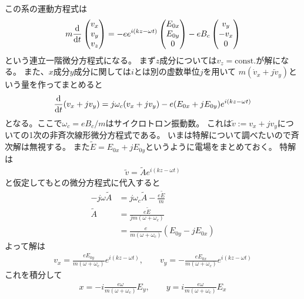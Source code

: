 \documentclass[../../master.tex]{subfiles}
\begin{document}
\section{}
この系の運動方程式は
\begin{align}
    m\dv{t}\begin{pmatrix}
        v_x\\ v_y\\ v_z
    \end{pmatrix}
    =-ee^{i(kz-\omega t)}\begin{pmatrix}
        E_{0x}\\E_{0y}\\0
    \end{pmatrix}
    -eB_c\begin{pmatrix}
        v_y\\ -v_x\\0
    \end{pmatrix}
\end{align}
という連立一階微分方程式になる。
まず\(z\)成分については\(v_z=\text{const.}\)が解になる。
また、\(x\)成分\(y\)成分に関しては\(i\)とは別の虚数単位\(j\)を用いて
\(m(\dot{v}_x+j\dot{v}_y)\)という量を作ってまとめると
\begin{align}
    \dv{t}(v_x+jv_y) = j\omega_c (v_x+jv_y) -e(E_{0x}+jE_{0y})e^{i(kz-\omega t)}
\end{align}
となる。ここで\(\omega_c=eB_c/m\)はサイクロトロン振動数。
これは\(\tilde{v}:=v_x+jv_y\)についての1次の非斉次線形微分方程式である。
いまは特解について調べたいので斉次解は無視する。
また\(\tilde{E} = E_{0x}+jE_{0y}\)というように電場をまとめておく。
特解は
\begin{align}
    \tilde{v} = \tilde{A}e^{i(kz-\omega t)}
\end{align}
と仮定してもとの微分方程式に代入すると
\begin{align}
    -j\omega \tilde{A} &= j\omega_c \tilde{A} -\frac{e\tilde{E}}{m}\\
    \tilde{A} &= \frac{e\tilde{E}}{jm(\omega+\omega_c)} \\
    &= \frac{e}{m(\omega+\omega_c)}(E_{0y}-jE_{0x})
\end{align}
よって解は
\begin{align}
    v_x =  \frac{eE_{0y}}{m(\omega+\omega_c)}e^{i(kz-\omega t)},\qquad
    v_y = - \frac{eE_{0x}}{m(\omega+\omega_c)}e^{i(kz-\omega t)}
\end{align}
これを積分して
\begin{align}
    x = -i\frac{e\omega}{m(\omega+\omega_c)}E_{y},\qquad
    y = i\frac{e\omega}{m(\omega+\omega_c)}E_{x}
\end{align}
\end{document}
